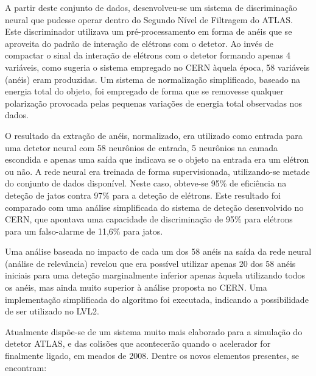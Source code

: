 A partir deste conjunto de dados, desenvolveu-se um sistema de discriminação
neural que pudesse operar dentro do Segundo Nível de Filtragem do ATLAS. Este
discriminador utilizava um pré-processamento em forma de anéis que se
aproveita do padrão de interação de elétrons com o detetor. Ao invés de
compactar o sinal da interação de elétrons com o detetor formando apenas 4
variáveis, como sugeria o sistema empregado no CERN àquela época, 58 variáveis
(anéis) eram produzidas. Um sistema de normalização simplificado, baseado na
energia total do objeto, foi empregado de forma que se removesse qualquer
polarização provocada pelas pequenas variações de energia total observadas nos
dados.

O resultado da extração de anéis, normalizado, era utilizado como entrada para
uma detetor neural com 58 neurônios de entrada, 5 neurônios na camada
escondida e apenas uma saída que indicava se o objeto na entrada era um
elétron ou não. A rede neural era treinada de forma supervisionada,
utilizando-se metade do conjunto de dados disponível. Neste caso, obteve-se
95\% de eficiência na deteção de jatos contra 97\% para a deteção de
elétrons. Este resultado foi comparado com uma análise simplificada do sistema
de deteção desenvolvido no CERN, que apontava uma capacidade de discriminação
de 95\% para elétrons para um falso-alarme de 11,6\% para jatos.

Uma análise baseada no impacto de cada um dos 58 anéis na saída da rede neural
(análise de relevância) revelou que era possível utilizar apenas 20 dos 58
anéis iniciais para uma deteção marginalmente inferior apenas àquela
utilizando todos os anéis, mas ainda muito superior à análise proposta no
CERN. Uma implementação simplificada do algoritmo foi executada, indicando a
possibilidade de ser utilizado no LVL2.

Atualmente dispõe-se de um sistema muito mais elaborado para a simulação do
detetor ATLAS, e das colisões que acontecerão quando o acelerador for
finalmente ligado, em meados de 2008. Dentre os novos elementos presentes, se
encontram:

